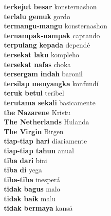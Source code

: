 \textbf{ terkejut besar  } konsternashon \\
\textbf{ terlalu gemuk  } gordo \\
\textbf{ termangu-mangu  } konsternashon \\
\textbf{ ternampak-nampak  } captando \\
\textbf{ terpulang kepada  } dependé \\
\textbf{ tersekat laku  } kompleho \\
\textbf{ tersekat nafas  } choka \\
\textbf{ tersergam indah  } baronil \\
\textbf{ tersilap menyangka  } konfundí \\
\textbf{ teruk betul  } teribel \\
\textbf{ terutama sekali  } basicamente \\
\textbf{ the Nazarene  } Kristu \\
\textbf{ The Netherlands  } Hulanda \\
\textbf{ The Virgin  } Birgen \\
\textbf{ tiap-tiap hari  } diariamente \\
\textbf{ tiap-tiap tahun  } anual \\
\textbf{ tiba dari  } bini \\
\textbf{ tiba di  } yega \\
\textbf{ tiba-tiba  } inesperá \\
\textbf{ tidak bagus  } malo \\
\textbf{ tidak baik  } malu \\
\textbf{ tidak bermaya  } kansá \\
